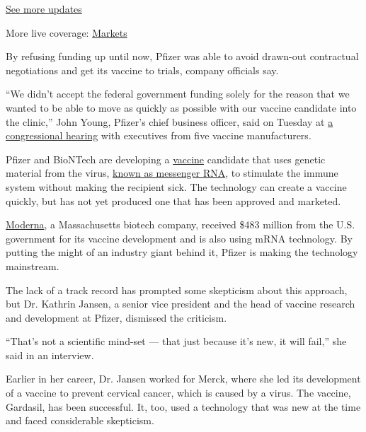 \href{https://www.nytimes.com/2020/08/01/world/coronavirus-covid-19.html?action=click\&pgtype=Article\&state=default\&region=MAIN_CONTENT_1\&context=storylines_live_updates}{See
more updates}

More live coverage:
\href{https://www.nytimes.com/live/2020/07/31/business/stock-market-today-coronavirus?action=click\&pgtype=Article\&state=default\&region=MAIN_CONTENT_1\&context=storylines_live_updates}{Markets}

By refusing funding up until now, Pfizer was able to avoid drawn-out
contractual negotiations and get its vaccine to trials, company
officials say.

``We didn't accept the federal government funding solely for the reason
that we wanted to be able to move as quickly as possible with our
vaccine candidate into the clinic,'' John Young, Pfizer's chief business
officer, said on Tuesday at
\href{https://www.nytimes.com/2020/07/21/health/covid-19-vaccine-coronavirus-moderna-pfizer.html}{a
congressional hearing} with executives from five vaccine manufacturers.

Pfizer and BioNTech are developing a
\href{https://www.nytimes.com/2020/05/15/us/politics/coronavirus-vaccine-timeline.html}{vaccine}
candidate that uses genetic material from the virus,
\href{https://www.nytimes.com/2020/05/05/health/pfizer-vaccine-coronavirus.html}{known
as messenger RNA}, to stimulate the immune system without making the
recipient sick. The technology can create a vaccine quickly, but has not
yet produced one that has been approved and marketed.

\href{https://www.nytimes.com/2020/07/27/health/moderna-vaccine-covid.html}{Moderna},
a Massachusetts biotech company, received \$483 million from the U.S.
government for its vaccine development and is also using mRNA
technology. By putting the might of an industry giant behind it, Pfizer
is making the technology mainstream.

The lack of a track record has prompted some skepticism about this
approach, but Dr. Kathrin Jansen, a senior vice president and the head
of vaccine research and development at Pfizer, dismissed the criticism.

``That's not a scientific mind-set --- that just because it's new, it
will fail,'' she said in an interview.

Earlier in her career, Dr. Jansen worked for Merck, where she led its
development of a vaccine to prevent cervical cancer, which is caused by
a virus. The vaccine, Gardasil, has been successful. It, too, used a
technology that was new at the time and faced considerable skepticism.

